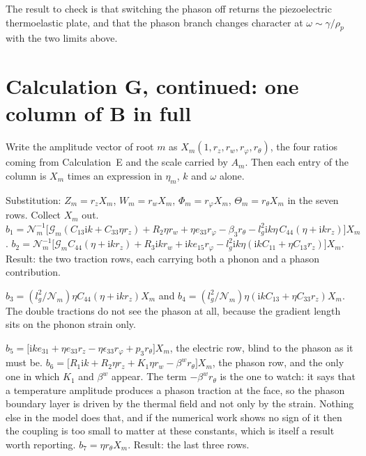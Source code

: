 \documentclass[11pt]{article}
\makeatletter
\newif\ifshowworked
\newenvironment{worked}{%
  \ifshowworked\par\smallskip\noindent\textit{Working.}\par\smallskip\else
  \setbox\z@\vbox\bgroup\fi}{\ifshowworked\par\smallskip\else\egroup\fi}
\newcommand{\ii}{\mathrm{i}}
\newcommand{\Ncal}{\mathcal{N}}
\newcommand{\Gcal}{\mathcal{G}}
\makeatother
\begin{document}
The result to check is that switching the phason off returns the piezoelectric thermoelastic plate, and
that the phason branch changes character at $\omega\sim\gamma/\rho_p$ with the two limits above.

\section{Calculation G, continued: one column of $\mathbf B$ in full}

Write the amplitude vector of root $m$ as $X_m(1,r_z,r_w,r_\varphi,r_\theta)$, the four ratios coming from
Calculation~E and the scale carried by $A_m$. Then each entry of the column is $X_m$ times an expression in
$\eta_m$, $k$ and $\omega$ alone.

\begin{worked}
Substitution: $Z_m=r_zX_m$, $W_m=r_wX_m$, $\Phi_m=r_\varphi X_m$, $\Theta_m=r_\theta X_m$ in the seven
rows. Collect $X_m$ out.
$b_1=\Ncal_m^{-1}\bigl[\Gcal_m(C_{13}\ii k+C_{33}\eta r_z)+R_2\eta r_w+\eta e_{33}r_\varphi-\beta_3r_\theta
-l_g^2\ii k\eta\,C_{44}(\eta+\ii kr_z)\bigr]X_m$.
$b_2=\Ncal_m^{-1}\bigl[\Gcal_mC_{44}(\eta+\ii kr_z)+R_3\ii kr_w+\ii ke_{15}r_\varphi
-l_g^2\ii k\eta(\ii kC_{11}+\eta C_{13}r_z)\bigr]X_m$.
Result: the two traction rows, each carrying both a phonon and a phason contribution.
\end{worked}

\begin{worked}
$b_3=(l_g^2/\Ncal_m)\eta C_{44}(\eta+\ii kr_z)X_m$ and
$b_4=(l_g^2/\Ncal_m)\eta(\ii kC_{13}+\eta C_{33}r_z)X_m$. The double tractions do not see the phason at
all, because the gradient length sits on the phonon strain only.
\end{worked}

\begin{worked}
$b_5=\bigl[\ii ke_{31}+\eta e_{33}r_z-\eta\epsilon_{33}r_\varphi+p_3r_\theta\bigr]X_m$, the electric row,
blind to the phason as it must be.
$b_6=\bigl[R_1\ii k+R_2\eta r_z+K_1\eta r_w-\beta^{w}r_\theta\bigr]X_m$, the phason row, and the only one
in which $K_1$ and $\beta^{w}$ appear. The term $-\beta^{w}r_\theta$ is the one to watch: it says that a
temperature amplitude produces a phason traction at the face, so the phason boundary layer is driven by
the thermal field and not only by the strain. Nothing else in the model does that, and if the numerical
work shows no sign of it then the coupling is too small to matter at these constants, which is itself a
result worth reporting.
$b_7=\eta r_\theta X_m$. Result: the last three rows.
\end{worked}
\end{document}
